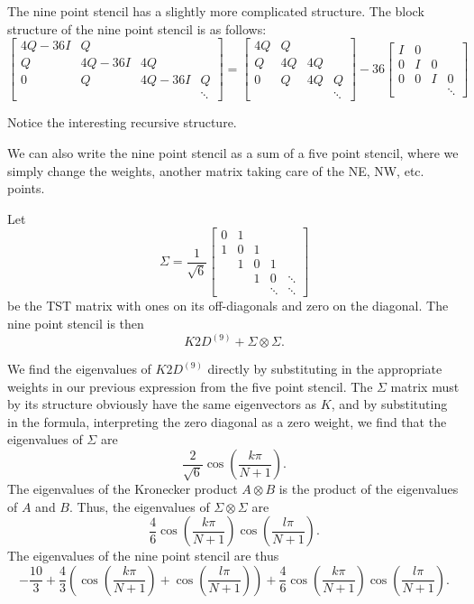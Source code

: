 The nine point stencil has a slightly more complicated structure.
The block structure of the nine point stencil is as follows:
$$
\begin{bmatrix}
  4Q - 36 I & Q \\
  Q & 4Q - 36 I & 4Q \\
  0 & Q & 4Q - 36 I & Q \\
  & & & \ddots
\end{bmatrix}
=
\begin{bmatrix}
  4Q & Q \\
  Q & 4Q & 4Q \\
  0 & Q & 4Q & Q \\
  & & & \ddots
\end{bmatrix}
-
36
\begin{bmatrix}
  I & 0 \\
  0 & I & 0 \\
  0 & 0 & I & 0 \\
  & & & \ddots
\end{bmatrix}
$$

Notice the interesting recursive structure.

We can also write the nine point stencil as a sum of a five point stencil, where we simply change the weights, another matrix taking care of the NE, NW, etc. points.

Let
\begin{equation}
  \Sigma =
  \frac{1}{\sqrt{6}}
  \begin{bmatrix}
    0 & 1  \\
    1 & 0 & 1 \\
      & 1 & 0 & 1 \\
      &   & 1 & 0 & \ddots\\
      &   &   & \ddots  & \ddots
  \end{bmatrix}
\end{equation}
be the TST matrix with ones on its off-diagonals and zero on the diagonal.
The nine point stencil is then
\begin{equation}
  K2D^{(9)} + \Sigma \otimes \Sigma.
\end{equation}

We find the eigenvalues of $K2D^{(9)}$ directly by substituting in the appropriate weights in our previous expression from the five point stencil.
The $\Sigma$ matrix must by its structure obviously have the same eigenvectors as $K$, and by substituting in the formula, interpreting the zero diagonal as a zero weight, we find that the eigenvalues of $\Sigma$ are
$$
\frac{2}{\sqrt{6}} \cos(\frac{k \pi}{N+1}).
$$
The eigenvalues of the Kronecker product $A \otimes B$ is the product of the eigenvalues of $A$ and $B$.
Thus, the eigenvalues of $\Sigma \otimes \Sigma$ are
$$
\frac46
\cos(\frac{k \pi}{N+1})
\cos(\frac{l \pi}{N+1}).
$$
The eigenvalues of the nine point stencil are thus
\begin{equation}
  -\frac{10}{3}
  + \frac43
  \left(
  \cos(\frac{k \pi}{N+1})
  + \cos(\frac{l \pi}{N+1})
  \right)
  +
  \frac46
  \cos(\frac{k \pi}{N+1})
  \cos(\frac{l \pi}{N+1}).
\end{equation}

